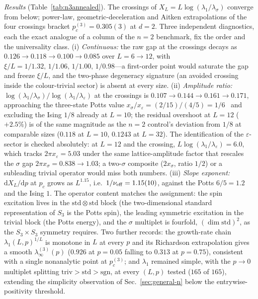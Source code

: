 \documentclass[aps,prx,reprint,superscriptaddress,nobibnotes,longbibliography]{revtex4-2}
\theoremstyle{remark}
\begin{document}
\emph{Results} (Table~\ref{tab:n3annealed}).  The crossings of $X_L=L\log(\lambda_1/\lambda_\sigma)$ converge from below; power-law, geometric-deceleration and Aitken extrapolations of the four crossings bracket $p_c^{(3)}=0.305(3)$ at $d=2$.  Three independent diagnostics, each the exact analogue of a column of the $n=2$ benchmark, fix the order and the universality class.  (i) \emph{Continuous:} the raw gap at the crossings decays as $0.126\to0.118\to0.100\to0.085$ over $L=6\to12$, with $\xi/L=1/1.32,\,1/1.06,\,1/1.00,\,1/0.98$---a first-order point would saturate the gap and freeze $\xi/L$, and the two-phase degeneracy signature (an avoided crossing inside the colour-trivial sector) is absent at every size.  (ii) \emph{Amplitude ratio:} $\log(\lambda_1/\lambda_\sigma)/\log(\lambda_1/\lambda_\varepsilon)$ at the crossings is $0.107\to0.144\to0.161\to0.171$, approaching the three-state Potts value $x_\sigma/x_\varepsilon=(2/15)/(4/5)=1/6$~\cite{Wu1982} and excluding the Ising $1/8$ already at $L=10$; the residual overshoot at $L=12$ ($+2.5\%$) is of the same magnitude as the $n=2$ control's deviation from $1/8$ at comparable sizes ($0.118$ at $L=10$, $0.1243$ at $L=32$).  The identification of the $\varepsilon$-sector is checked absolutely: at $L=12$ and the crossing, $L\log(\lambda_1/\lambda_\varepsilon)=6.0$, which tracks $2\pi x_\varepsilon=5.03$ under the same lattice-amplitude factor that rescales the $\sigma$ gap $2\pi x_\sigma=0.838\to1.03$; a two-$\sigma$ composite ($2x_\sigma$, ratio $1/2$) or a subleading trivial operator would miss both numbers.  (iii) \emph{Slope exponent:} $\mathrm{d}X_L/\mathrm{d}p$ at $p_c$ grows as $L^{1.15}$, i.e.\ $1/\nu_{\rm eff}=1.15(10)$, against the Potts $6/5=1.2$ and the Ising $1$.  The operator content matches the assignment: the spin excitation lives in the $\mathrm{std}\otimes\mathrm{std}$ block (the two-dimensional standard representation of $S_3$ is the Potts spin), the leading symmetric excitation in the trivial block (the Potts energy), and the $\sigma$ multiplet is fourfold, $(\dim\mathrm{std})^2$, as the $S_3\times S_3$ symmetry requires.  Two further records: the growth-rate chain $\lambda_1(L,p)^{1/L}$ is monotone in $L$ at every $p$ and its Richardson extrapolation gives a smooth $\lambda_\infty^{(3)}(p)$ ($0.926$ at $p=0.05$ falling to $0.313$ at $p=0.75$), consistent with a single nonanalytic point at $p_c^{(3)}$; and $\lambda_1$ remained simple, with the $p\to0$ multiplet splitting $\mathrm{triv}>\mathrm{std}>\mathrm{sgn}$, at every $(L,p)$ tested ($165$ of $165$), extending the simplicity observation of Sec.~\ref{sec:general-n} below the entrywise-positivity threshold.
\end{document}
